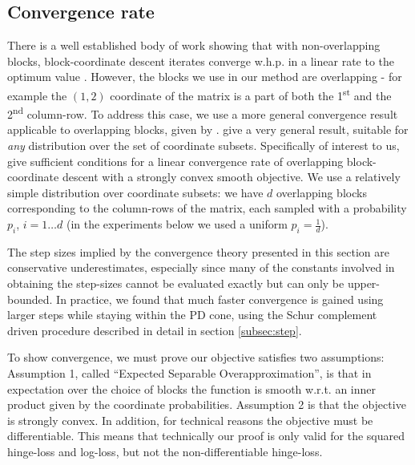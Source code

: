 \documentclass[twoside,11pt]{article}
\begin{document}
\subsection{Convergence rate}
There is a well established body of work showing that with non-overlapping blocks, block-coordinate descent iterates converge w.h.p. in a linear rate to the optimum value \citep{nesterov2012efficiency,richtarik2014iteration}.
However, the blocks we use in our method are overlapping - for example the $(1,2)$ coordinate of the matrix is a part of both the 1\textsuperscript{st} and the 2\textsuperscript{nd} column-row. To address this case, we use a more general convergence result applicable to overlapping blocks, given by \citet{richtarik2013optimal}. \citeauthor{richtarik2013optimal} give a very general result, suitable for \emph{any} distribution over the set of coordinate subsets. 
Specifically of interest to us, \citeauthor{richtarik2013optimal} give sufficient conditions for a linear convergence rate of overlapping block-coordinate descent with a strongly convex smooth objective. 
We use a relatively simple distribution over coordinate subsets: we have $d$ overlapping blocks corresponding to the column-rows of the matrix, each sampled with a probability $p_i$, $i=1 \ldots d$ (in the experiments below we used a uniform $p_i = \frac{1}{d}$).

The step sizes implied by the convergence theory presented in this section are conservative underestimates, especially since many of the constants involved in obtaining the step-sizes cannot be evaluated exactly but can only be upper-bounded. In practice, we found that much faster convergence is gained using larger steps while staying within the PD cone, using the Schur complement driven procedure described in detail in section \ref{subsec:step}.

To show convergence, we must prove our objective satisfies two assumptions: Assumption 1, called ``Expected Separable Overapproximation'', is that in expectation over the choice of blocks the function is smooth w.r.t. an inner product given by the coordinate probabilities. Assumption 2 is that the objective is strongly convex. In addition, for technical reasons the objective must be differentiable. This means that technically our proof is only valid for the squared hinge-loss and log-loss, but not the non-differentiable hinge-loss.
\end{document}
